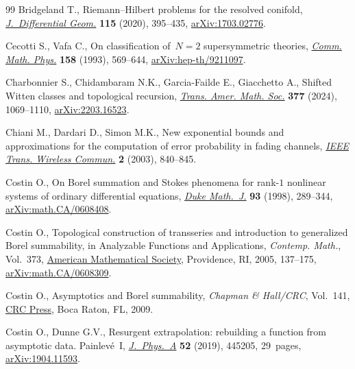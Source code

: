 \documentclass[pdftex]{sigma}
\numberwithin{equation}{section}
\begin{document}
\begin{thebibliography}{99}
Bridgeland T., Riemann--{H}ilbert problems for the resolved conifold,
 \href{https://doi.org/10.4310/jdg/1594260015}{\textit{J.~Differential Geom.}}
 \textbf{115} (2020), 395--435,
 \href{http://arxiv.org/abs/1703.02776}{arXiv:1703.02776}.

Cecotti S., Vafa C., On classification of~{$N=2$} supersymmetric theories,
 \href{https://doi.org/10.1007/BF02096804}{\textit{Comm. Math. Phys.}}
 \textbf{158} (1993), 569--644,
 \href{http://arxiv.org/abs/hep-th/9211097}{arXiv:hep-th/9211097}.

Charbonnier S., Chidambaram N.K., Garcia-Failde E., Giacchetto A., Shifted
 {W}itten classes and topological recursion,
 \href{https://doi.org/10.1090/tran/9046}{\textit{Trans. Amer. Math. Soc.}}
 \textbf{377} (2024), 1069--1110,
 \href{http://arxiv.org/abs/2203.16523}{arXiv:2203.16523}.

Chiani M., Dardari D., Simon M.K., New exponential bounds and approximations
 for the computation of error probability in fading channels,
 \href{https://doi.org/10.1109/TWC.2003.814350}{\textit{IEEE Trans. Wireless
 Commun.}} \textbf{2} (2003), 840--845.

Costin O., On {B}orel summation and {S}tokes phenomena for rank-{$1$} nonlinear
 systems of ordinary differential equations,
 \href{https://doi.org/10.1215/S0012-7094-98-09311-5}{\textit{Duke Math.~J.}}
 \textbf{93} (1998), 289--344,
 \href{http://arxiv.org/abs/math.CA/0608408}{arXiv:math.CA/0608408}.

Costin O., Topological construction of transseries and introduction to
 generalized {B}orel summability, in Analyzable {F}unctions and
 {A}pplications, \textit{Contemp. Math.}, Vol.~373,
 \href{https://doi.org/10.1090/conm/373/06918}{American Mathematical Society},
 Providence, RI, 2005, 137--175,
 \href{http://arxiv.org/abs/math.CA/0608309}{arXiv:math.CA/0608309}.

Costin O., Asymptotics and {B}orel summability, \textit{Chapman \& Hall/CRC},
 Vol.~141, \href{https://doi.org/10.1201/9781420070323}{CRC Press}, Boca Raton,
 FL, 2009.

Costin O., Dunne G.V., Resurgent extrapolation: rebuilding a function from
 asymptotic data. {P}ainlev\'e~{I},
 \href{https://doi.org/10.1088/1751-8121/ab477b}{\textit{J.~Phys.~A}}
 \textbf{52} (2019), 445205, 29~pages,
 \href{http://arxiv.org/abs/1904.11593}{arXiv:1904.11593}.


\end{thebibliography}
\end{document}

